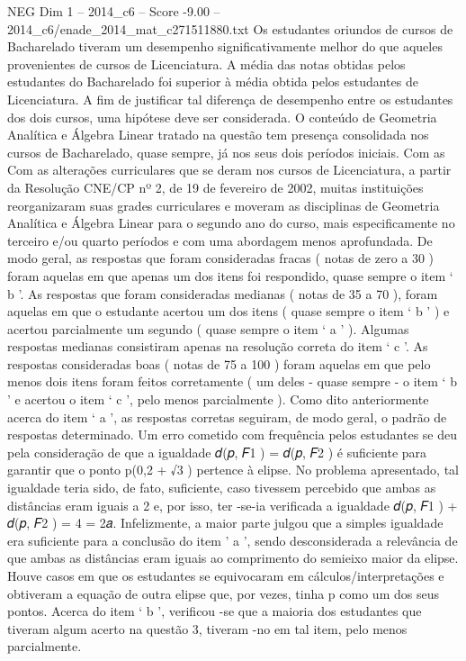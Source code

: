 \begin{textsample}{NEG Dim 1 – 2014\_c6 – Score -9.00 – 2014\_c6/enade\_2014\_mat\_c271511880.txt}
Os estudantes oriundos de cursos de Bacharelado tiveram um desempenho significativamente melhor do que aqueles provenientes de cursos de Licenciatura.
A média das notas obtidas pelos estudantes do Bacharelado foi superior à média obtida pelos estudantes de Licenciatura.
A fim de justificar tal diferença de desempenho entre os estudantes dos dois cursos, uma hipótese deve ser considerada.
O conteúdo de Geometria Analítica e Álgebra Linear tratado na questão tem presença consolidada nos cursos de Bacharelado, quase sempre, já nos seus dois períodos iniciais.
Com as Com as alterações curriculares que se deram nos cursos de Licenciatura, a partir da Resolução CNE/CP nº 2, de 19 de fevereiro de 2002, muitas instituições reorganizaram suas grades curriculares e moveram as disciplinas de Geometria Analítica e Álgebra Linear para o segundo ano do curso, mais especificamente no terceiro e/ou quarto períodos e com uma abordagem menos aprofundada.
De modo geral, as respostas que foram consideradas fracas ( notas de zero a 30 ) foram aquelas em que apenas um dos itens foi respondido, quase sempre o item ‘ b ’.
As respostas que foram consideradas medianas ( notas de 35 a 70 ), foram aquelas em que o estudante acertou um dos itens ( quase sempre o item ‘ b ’ ) e acertou parcialmente um segundo ( quase sempre o item ‘ a ’ ).
Algumas respostas medianas consistiram apenas na resolução correta do item ‘ c ’.
As respostas consideradas boas ( notas de 75 a 100 ) foram aquelas em que pelo menos dois itens foram feitos corretamente ( um deles - quase sempre - o item ‘ b ’ e acertou o item ‘ c ’, pelo menos parcialmente ).
Como dito anteriormente acerca do item ‘ a ’, as respostas corretas seguiram, de modo geral, o padrão de respostas determinado.
Um erro cometido com frequência pelos estudantes se deu pela consideração de que a igualdade 𝑑(𝑝, 𝐹1 ) = 𝑑(𝑝, 𝐹2 ) é suficiente para garantir que o ponto p(0,2 + √3 ) pertence à elipse.
No problema apresentado, tal igualdade teria sido, de fato, suficiente, caso tivessem percebido que ambas as distâncias eram iguais a 2 e, por isso, ter -se-ia verificada a igualdade 𝑑(𝑝, 𝐹1 ) + 𝑑(𝑝, 𝐹2 ) = 4 = 2𝑎.
Infelizmente, a maior parte julgou que a simples igualdade era suficiente para a conclusão do item ’ a ’, sendo desconsiderada a relevância de que ambas as distâncias eram iguais ao comprimento do semieixo maior da elipse.
Houve casos em que os estudantes se equivocaram em cálculos/interpretações e obtiveram a equação de outra elipse que, por vezes, tinha p como um dos seus pontos.
Acerca do item ‘ b ’, verificou -se que a maioria dos estudantes que tiveram algum acerto na questão 3, tiveram -no em tal item, pelo menos parcialmente.

\end{textsample}
